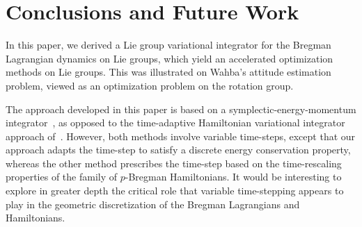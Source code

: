 \documentclass[letterpaper, 10pt, conference]{ieeeconf}
\begin{document}
\section{Conclusions and Future Work}
In this paper, we derived a Lie group variational integrator for the Bregman Lagrangian dynamics on Lie groups, which yield an accelerated optimization methods on Lie groups. This was illustrated on Wahba's attitude estimation problem, viewed as an optimization problem on the rotation group.

The approach developed in this paper is based on a symplectic-energy-momentum integrator~\cite{KaMaOr1999}, as opposed to the time-adaptive Hamiltonian variational integrator approach of~\cite{DuScLe2021}. However, both methods involve variable time-steps, except that our approach adapts the time-step to satisfy a discrete energy conservation property, whereas the other method prescribes the time-step based on the time-rescaling properties of the family of $p$-Bregman Hamiltonians. It would be interesting to explore in greater depth the critical role that variable time-stepping appears to play in the geometric discretization of the Bregman Lagrangians and Hamiltonians.




\end{document}
